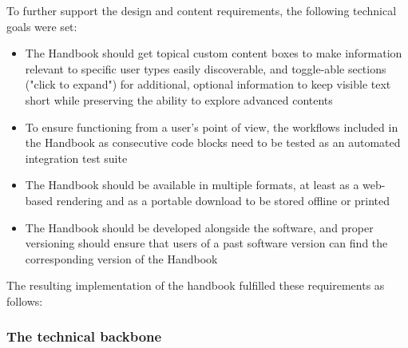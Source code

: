 To further support the design and content requirements, the following technical goals were set:

\begin{itemize}
	\item The Handbook should get topical custom content boxes to make information relevant to specific user types easily discoverable, and toggle-able sections ("click to expand") for additional, optional information to keep visible text short while preserving the ability to explore advanced contents
	\item To ensure functioning from a user's point of view, the workflows included in the Handbook as consecutive code blocks need to be tested as an automated integration test suite
	\item The Handbook should be available in multiple formats, at least as a web-based rendering and as a portable download to be stored offline or printed
	\item The Handbook should be developed alongside the software, and proper versioning should ensure that users of a past software version can find the corresponding version of the Handbook
\end{itemize}

The resulting implementation of the handbook fulfilled these requirements as follows:


\subsubsection{The technical backbone}

